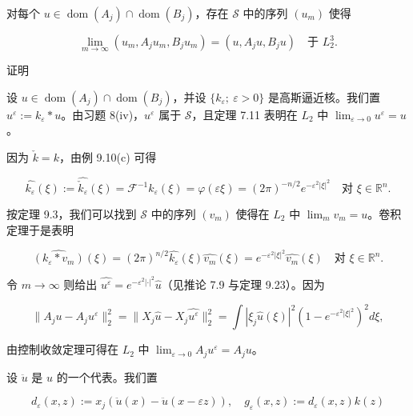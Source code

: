 \begin{lemma}

对每个 $ u \in \operatorname{dom}(A_j) \cap \operatorname{dom}(B_j) $，存在 $ \mathcal{S} $ 中的序列 $ (u_m) $ 使得

\[
\lim_{m \to \infty} (u_m, A_j u_m, B_j u_m) = (u, A_j u, B_j u) \quad \text{于 } L_2^3 .
\]

证明

\begin{subitems}
\item

设 $ u \in \operatorname{dom}(A_j) \cap \operatorname{dom}(B_j) $，并设 $ \{k_\varepsilon ;\ \varepsilon > 0\} $ 是高斯逼近核。我们置 $ u^\varepsilon := k_\varepsilon * u $。由习题 8(iv)，$ u^\varepsilon $ 属于 $ \mathcal{S} $，且定理 7.11 表明在 $ L_2 $ 中 $ \lim_{\varepsilon \to 0} u^\varepsilon = u $。

\item

因为 $ \check{k} = k $，由例 9.10(c) 可得

\[
\widehat{k_\varepsilon}(\xi) := \widehat{\check{k}_\varepsilon}(\xi) = \mathcal{F}^{-1}k_\varepsilon(\xi) = \varphi(\varepsilon\xi) = (2\pi)^{-n/2} e^{-\varepsilon^2|\xi|^2} \quad \text{对 } \xi \in \mathbb{R}^n .
\]

按定理 9.3，我们可以找到 $ \mathcal{S} $ 中的序列 $ (v_m) $ 使得在 $ L_2 $ 中 $ \lim_m v_m = u $。卷积定理于是表明

\[
\widehat{(k_\varepsilon * v_m)}(\xi) = (2\pi)^{n/2}\widehat{k_\varepsilon}(\xi)\widehat{v_m}(\xi) = e^{-\varepsilon^2|\xi|^2}\widehat{v_m}(\xi) \quad \text{对 } \xi \in \mathbb{R}^n .
\]

令 $ m \to \infty $ 则给出 $ \widehat{u^\varepsilon} = e^{-\varepsilon^2|\cdot|^2}\widehat{u} $（见推论 7.9 与定理 9.23）。因为

\[
\|A_j u - A_j u^\varepsilon\|_2^2 = \|X_j\hat{u} - X_j\widehat{u^\varepsilon}\|_2^2 = \int |\xi_j\hat{u}(\xi)|^2\left(1 - e^{-\varepsilon^2|\xi|^2}\right)^2 d\xi ,
\]

由控制收敛定理可得在 $ L_2 $ 中 $ \lim_{\varepsilon \to 0} A_j u^\varepsilon = A_j u $。

\item

设 $ \ddot{u} $ 是 $ u $ 的一个代表。我们置

\[
d_\varepsilon(x,z) := x_j\left(\ddot{u}(x) - \ddot{u}(x - \varepsilon z)\right) , \quad g_\varepsilon(x,z) := d_\varepsilon(x,z)k(z)
\]


\end{subitems}
\end{lemma}
